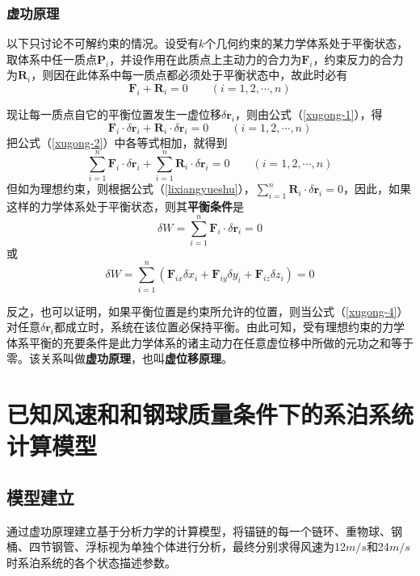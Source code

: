 \documentclass[withoutpreface,bwprint]{cumcmthesis} %
\begin{document}
\subsubsection{虚功原理}
\par 以下只讨论不可解约束的情况。设受有$k$个几何约束的某力学体系处于平衡状态，取体系中任一质点$\textbf{P}_i$，并设作用在此质点上主动力的合力为$\textbf{F}_i$，约束反力的合力为$\textbf{R}_i$，则因在此体系中每一质点都必须处于平衡状态中，故此时必有
\begin{equation}
	\label{xugong-1}
	\textbf{F}_i + \textbf{R}_i = 0 \qquad (i = 1,2,\cdots,n)
\end{equation}
\par 现让每一质点自它的平衡位置发生一虚位移$\delta \textbf{r}_i$，则由公式（\ref{xugong-1}），得
\begin{equation}
	\label{xugong-2}
	\textbf{F}_i \cdot \delta \textbf{r}_i+ \textbf{R}_i \cdot \delta \textbf{r}_i = 0 \qquad (i = 1,2,\cdots,n)
\end{equation}
把公式（\ref{xugong-2}）中各等式相加，就得到
\begin{equation}
	\label{xugong-3}
	\sum\limits_{i=1}^{n} \textbf{F}_i \cdot \delta \textbf{r}_i+ \sum\limits_{i=1}^{n} \textbf{R}_i \cdot \delta \textbf{r}_i = 0 \qquad (i = 1,2,\cdots,n)
\end{equation}
但如为理想约束，则根据公式（\ref{lixiangyueshu}），$\sum\limits_{i=1}^{n} \textbf{R}_i \cdot \delta \textbf{r}_i = 0$，因此，如果这样的力学体系处于平衡状态，则其\textbf{平衡条件}是
\begin{equation}
	\label{xugong-4}
	\delta W = \sum\limits_{i=1}^{n} \textbf{F}_i \cdot \delta \textbf{r}_i = 0
\end{equation}
或
\begin{equation}
	\label{xugong-5}
	\delta W = \sum\limits_{i=1}^{n} (\textbf{F}_{ix} \delta x_i + \textbf{F}_{iy} \delta y_i + \textbf{F}_{iz} \delta z_i) = 0
\end{equation}
\par 反之，也可以证明，如果平衡位置是约束所允许的位置，则当公式（\ref{xugong-4}）对任意$\delta \textbf{r}_i$都成立时，系统在该位置必保持平衡。由此可知，受有理想约束的力学体系平衡的充要条件是此力学体系的诸主动力在任意虚位移中所做的元功之和等于零。该关系叫做\textbf{虚功原理}，也叫\textbf{虚位移原理}。
\newpage
\section{已知风速和和钢球质量条件下的系泊系统计算模型}
\subsection{模型建立}
\par 通过虚功原理建立基于分析力学的计算模型，将锚链的每一个链环、重物球、钢桶、四节钢管、浮标视为单独个体进行分析，最终分别求得风速为12$m/s$和24$m/s$时系泊系统的各个状态描述参数。
\end{document}
